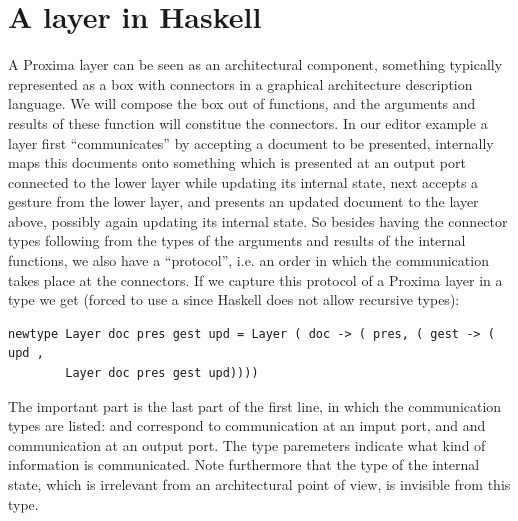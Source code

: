\documentclass{llncs}
\begin{document}
\section{A layer in Haskell} \label{sect:layerInHaskell}
A Proxima layer can be seen as an architectural component, something typically represented as a box with connectors in a graphical architecture description language. We will compose the box out of functions, and the arguments and results of these function will constitue the connectors. In our editor example a layer first ``communicates'' by accepting a document to be presented, internally maps this documents onto something which is presented at an output port connected to the lower layer while updating its internal state, next accepts a gesture from the lower layer, and presents an updated document to the layer above, possibly again updating its internal state. So besides having the connector types following from the types of the arguments and results of the internal functions, we also have a ``protocol'', i.e. an order in which the communication takes place at the connectors. 
If we capture this protocol of a Proxima layer in a type we get (forced to use a  since Haskell does not allow recursive types):

\begin{small}
\begin{verbatim}
newtype Layer doc pres gest upd = Layer ( doc -> ( pres, ( gest -> ( upd , 
        Layer doc pres gest upd))))
\end{verbatim}
\end{small}

The important part is the last part of the first line, in which the communication types are listed:  and correspond to communication at an imput port, and  and  communication at an output port. The type paremeters indicate what kind of information is communicated. Note furthermore that the type of the internal state, which is irrelevant from an architectural point of view, is invisible from this type.





\end{document}
